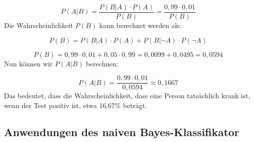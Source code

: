\documentclass[12pt]{article}
\begin{document}
\[
P(A|B) = \frac{P(B|A) \cdot P(A)}{P(B)} = \frac{0{,}99 \cdot 0{,}01}{P(B)}
\]
%
Die Wahrscheinlichkeit \( P(B) \) kann berechnet werden als:

\[
P(B) = P(B|A) \cdot P(A) + P(B|\neg A) \cdot P(\neg A)
\]

\[
P(B) = 0{,}99 \cdot 0{,}01 + 0{,}05 \cdot 0{,}99 = 0{,}0099 + 0{,}0495 = 0{,}0594
\]
%
Nun können wir \( P(A|B) \) berechnen:

\[
P(A|B) = \frac{0{,}99 \cdot 0{,}01}{0{,}0594} \approx 0{,}1667
\]
%
Das bedeutet, dass die Wahrscheinlichkeit, dass eine Person tatsächlich krank ist, wenn der Test positiv ist, etwa 16,67\% beträgt.\\

\subsection{Anwendungen des naiven Bayes-Klassifikator}
\end{document}
